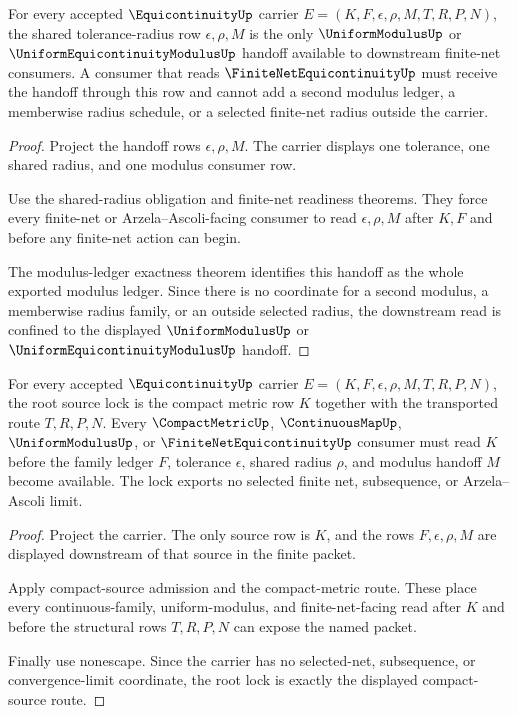 \begin{theorem}
\label{thm:equicontinuity-modulus-handoff-admission}
For every accepted $\EquicontinuityUp$ carrier $E=(K,F,\epsilon,\rho,M,T,R,P,N)$, the shared tolerance-radius row $\epsilon,\rho,M$ is the only $\UniformModulusUp$ or $\UniformEquicontinuityModulusUp$ handoff available to downstream finite-net consumers. A consumer that reads $\FiniteNetEquicontinuityUp$ must receive the handoff through this row and cannot add a second modulus ledger, a memberwise radius schedule, or a selected finite-net radius outside the carrier.
\end{theorem}
\begin{proof}
Project the handoff rows $\epsilon,\rho,M$. The carrier displays one tolerance, one shared radius, and one modulus consumer row.

Use the shared-radius obligation and finite-net readiness theorems. They force every finite-net or Arzela--Ascoli-facing consumer to read $\epsilon,\rho,M$ after $K,F$ and before any finite-net action can begin.

The modulus-ledger exactness theorem identifies this handoff as the whole exported modulus ledger. Since there is no coordinate for a second modulus, a memberwise radius family, or an outside selected radius, the downstream read is confined to the displayed $\UniformModulusUp$ or $\UniformEquicontinuityModulusUp$ handoff.
\end{proof}

\begin{theorem}
\label{thm:equicontinuity-root-compact-source-lock}
For every accepted $\EquicontinuityUp$ carrier $E=(K,F,\epsilon,\rho,M,T,R,P,N)$, the root source lock is the compact metric row $K$ together with the transported route $T,R,P,N$. Every $\CompactMetricUp$, $\ContinuousMapUp$, $\UniformModulusUp$, or $\FiniteNetEquicontinuityUp$ consumer must read $K$ before the family ledger $F$, tolerance $\epsilon$, shared radius $\rho$, and modulus handoff $M$ become available. The lock exports no selected finite net, subsequence, or Arzela--Ascoli limit.
\end{theorem}
\begin{proof}
Project the carrier. The only source row is $K$, and the rows $F,\epsilon,\rho,M$ are displayed downstream of that source in the finite packet.

Apply compact-source admission and the compact-metric route. These place every continuous-family, uniform-modulus, and finite-net-facing read after $K$ and before the structural rows $T,R,P,N$ can expose the named packet.

Finally use nonescape. Since the carrier has no selected-net, subsequence, or convergence-limit coordinate, the root lock is exactly the displayed compact-source route.
\end{proof}

